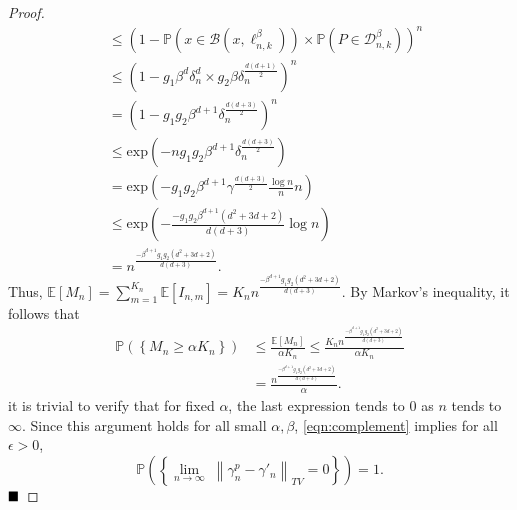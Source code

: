\documentclass[Afour,sageh,times]{sagej}
\newtheorem{lemma}{\bf Lemma}
\renewcommand{\qed}{\hfill\blacksquare}
\begin{document}
\begin{proof}
\begin{align}
    &\leq \left( 1- \mathbb{P}(x\in\mathcal{B}(x,\ell^\beta_{n,k})) \times  \mathbb{P}(P\in\mathcal{D}^\beta_{n,k}) \right)^n\nonumber\\
    &\leq \left( 1 - g_1 \beta^d \delta^{d}_{n}  \times g_2 \beta \delta_n^{\frac{d(d+1)}{2}}  \right)^n\nonumber\\
    &=
    \left(1-g_1 g_2 \beta^{d+1} \delta_n^{\frac{d(d+3)}{2}}\right)^{n}\nonumber\\ \nonumber
    &\leq \text{exp} \left(-n g_1 g_2 \beta^{d+1} \delta_n^{\frac{d(d+3)}{2}} \right)\\
    &=   \text{exp} \left(-g_1 g_2 \beta^{d+1} \gamma^{\frac{d(d+3)}{2}} \frac{\log n}{n}  n\right) \nonumber \\ \nonumber
    &\leq \text{exp} \left(-\frac{-g_1g_2\beta^{d+1}(d^2+3d+2)}{d(d+3)}\log n\right)\nonumber\\
    &= n^{\frac{-\beta^{d+1}g_1g_2(d^2+3d+2)}{d(d+3)}}. \nonumber
\end{align}
Thus, $\mathbb{E}[M_n]=\sum_{m=1}^{K_n} \mathbb{E}[I_{n,m}]= K_n n^{\frac{-\beta^{d+1}g_1g_2(d^2+3d+2)}{d(d+3)}}$. By Markov’s inequality, it follows that
\begin{align*}
    \mathbb{P}\left(\left\{M_{n} \geq \alpha K_{n}\right\}\right) &\leq \frac{\mathbb{E}[M_n]}{\alpha K_n} \leq \frac{K_n n^{\frac{-\beta^{d+1}g_1g_2(d^2+3d+2)}{d(d+3)}}}{\alpha K_n}\nonumber\\
    &= \frac{ n^{\frac{-\beta^{d+1}g_1g_2(d^2+3d+2)}{d(d+3)}}}{\alpha}.  
\end{align*}
it is trivial to verify that for fixed $\alpha$, the last expression tends to $0$ as $n$ tends to $\infty$. Since this argument holds for all small $\alpha, \beta$, 
\eqref{eqn:complement} implies for all $\epsilon>0$,
$$
\mathbb{P}\left(\left\{\underset{n\rightarrow\infty}{\lim}\;\left\|\gamma^p_{n}-\gamma'_{n}\right\|_{TV}=0\right\}\right)=1. 
$$
$\qed$
\end{proof}
\end{document}
